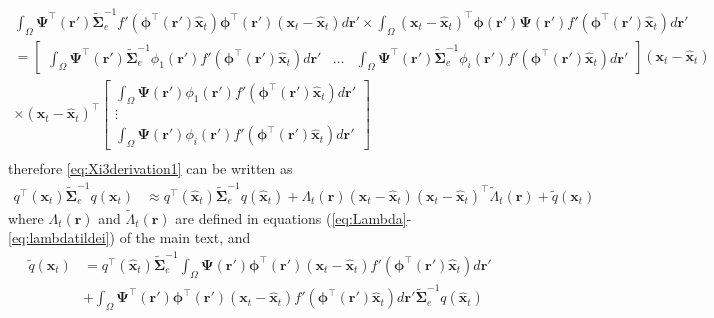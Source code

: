 \documentclass[]{article}
\begin{document}
\begin{align}
 \int_\Omega \boldsymbol{\Psi}^\top(\mathbf{r}') \tilde{\boldsymbol\Sigma}_e^{-1}f'(\boldsymbol \phi^\top(\mathbf r')\mathbf {\hat x}_t) \boldsymbol \phi^\top(\mathbf r')(\mathbf x_t - \mathbf  {\hat x}_t)d\mathbf{r}' \times\int_\Omega  (\mathbf x_t - \mathbf  {\hat x}_t)^\top\boldsymbol \phi(\mathbf r') \boldsymbol{\Psi}(\mathbf{r}')f'(\boldsymbol \phi^\top(\mathbf r')\mathbf {\hat x}_t) d\mathbf{r}'& \nonumber \\
=\begin{bmatrix} \int_{\Omega} \boldsymbol \Psi^\top(\mathbf r')\tilde{\boldsymbol \Sigma}_e^{-1}\phi_1(\mathbf r')f'(\boldsymbol\phi^\top(\mathbf r')\mathbf {\hat x}_t)d\mathbf r' &  \dots & \int_{\Omega} \boldsymbol \Psi^\top(\mathbf r')\tilde{\boldsymbol \Sigma}_e^{-1}\phi_i(\mathbf r')f'(\boldsymbol\phi^\top(\mathbf r')\mathbf {\hat x}_t)d\mathbf r'\end{bmatrix}(\mathbf x_t - \mathbf  {\hat x}_t) & \nonumber \\
\times (\mathbf x_t - \mathbf  {\hat x}_t)^\top \begin{bmatrix}\int_{\Omega} \boldsymbol \Psi(\mathbf r')\phi_1(\mathbf r')f'(\boldsymbol\phi^\top(\mathbf r')\mathbf {\hat x}_t)d\mathbf r' \\  \vdots \\ \int_{\Omega} \boldsymbol \Psi(\mathbf r')\phi_i(\mathbf r')f'(\boldsymbol\phi^\top(\mathbf r')\mathbf {\hat x}_t)d\mathbf r'\end{bmatrix}& \nonumber \\
\end{align}
therefore \ref{eq:Xi3derivation1} can be written as
\begin{align}\label{eq:Xi3derivation2}
  q^\top(\mathbf x_t)\tilde{\boldsymbol\Sigma}_e^{-1}q(\mathbf x_t)&\approx q^\top(\mathbf {\hat x}_t)\tilde{\boldsymbol\Sigma}_e^{-1}q(\mathbf {\hat x}_t)+\Lambda_t(\mathbf r)(\mathbf x_t - \mathbf  {\hat x}_t) (\mathbf x_t - \mathbf  {\hat x}_t)^\top\tilde{\Lambda}_t(\mathbf r)+\tilde{q}(\mathbf x_t)
\end{align}
where $\Lambda_t(\mathbf r)$ and $\tilde{\Lambda}_t(\mathbf r)$ are defined in equations (\ref{eq:Lambda}-\ref{eq:lambdatildei}) of the main text, and  
\begin{align}\label{eq:qtilde}
 \tilde{q}(\mathbf x_t)&=q^\top(\mathbf {\hat x}_t)\tilde{\boldsymbol\Sigma}_e^{-1}\int_\Omega \boldsymbol{\Psi}(\mathbf{r}')\boldsymbol \phi^\top(\mathbf r') (\mathbf x_t - \mathbf  {\hat x}_t)f'(\boldsymbol \phi^\top(\mathbf r')\mathbf {\hat x}_t) d\mathbf{r}'\nonumber\\
&+\int_\Omega \boldsymbol{\Psi}^\top(\mathbf{r}')\boldsymbol \phi^\top(\mathbf r') (\mathbf x_t - \mathbf  {\hat x}_t)f'(\boldsymbol \phi^\top(\mathbf r')\mathbf {\hat x}_t) d\mathbf{r}'\tilde{\boldsymbol\Sigma}_e^{-1}q(\mathbf {\hat x}_t)
\end{align}
\end{document}
